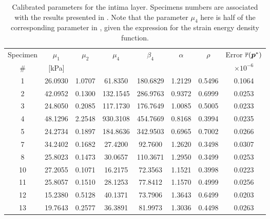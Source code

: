\begin{table}[ht!]
\caption[Calibrated parameters for the intima layer.]{Calibrated parameters for the intima layer. Specimens numbers are associated with the results presented in \cite{holzapfel2005determination}. Note that the parameter $\mu_4$ here is half of the corresponding parameter in \cite{holzapfel2005determination}, given the expression for the strain energy density function.}
\label{tab:cal-par-det-int}
\begin{center}
    \begin{tabular}{|c |c| c| c| c| c| c| c|} 
 \hline
 \quad Specimen \quad & \quad $\mu_1$ \quad & \quad $\mu_2$ \quad & \quad $\mu_4$ \quad & \quad $\beta_4$ \quad & \quad $\alpha$ \quad & \quad $\rho$ \quad & Error $\overline{r}(\boldsymbol{p}^*)$ \quad \\
 \quad \# \quad & [kPa] \quad & \quad [kPa] \quad & \quad [kPa] \quad & \quad [--] \quad & \quad [rad] \quad & \quad [--] \quad & $\times 10^{-6}$ \quad \\
 \cline{1-8} 
   1 & 26.0930 &   1.0707 &  61.8350 & 180.6829  &  1.2129 &   0.5496 &  0.1064\\
   2 & 42.0952 &   0.1300 & 132.1545 & 286.9763  &  0.9372  &  0.6999 & 0.0253\\
   3 & 24.8050 &   0.2085 & 117.1730 & 176.7649  &  1.0085  &  0.5005 & 0.0233\\
   4 & 48.1296 &   2.2548 & 930.3108 & 454.7669  &  0.8168  &  0.3994 & 0.0235\\
   5 & 24.2734 &   0.1897 & 184.8636 & 342.9503  &  0.6965  &  0.7002 & 0.0266\\
   7 & 34.2402 &   0.1682  & 27.4200 &  92.7600  &  1.2620  &  0.3498 & 0.0307\\
   8 & 25.8023 &   0.1473  & 30.0657 & 110.3671  &  1.2950  &  0.3499 & 0.0253\\
   10 & 27.2055 &   0.1071 &  16.2175 &  72.3563  &  1.1521  &  0.3998 & 0.0223\\
   11 & 25.8057 &   0.1510 &  28.1253  & 77.8412  &  1.1570  &  0.4999 & 0.0256\\
   12 & 15.2380 &   0.5128 &  40.1371 &  73.7906  &  1.3643  &  0.6499 & 0.0203\\
   13 & 19.7643 &   0.2577 &   36.3891 &  81.9973 &   1.3036  &  0.4498 & 0.0263\\
 \hline 
\end{tabular}
\end{center}
\end{table}



